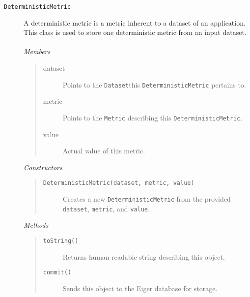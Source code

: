 \begin{description}
\item[\texttt{DeterministicMetric}] A deterministic metric is a metric inherent to a dataset of an application.
  This class is used to store one deterministic metric from an input dataset.\\ \\
  {\em Members}
	\begin{quote}
	\begin{description}
    \item[dataset] Points to the \texttt{Dataset}this \texttt{DeterministicMetric} pertains to.
    \item[metric] Points to the \texttt{Metric} describing this \texttt{DeterministicMetric}.
    \item[value] Actual value of this metric.
	\end{description}
	\end{quote}
  {\em Constructors}
	\begin{quote}
	\begin{description}
    \item[\texttt{DeterministicMetric(dataset, metric, value)}] Creates a new \texttt{DeterministicMetric} from the provided \texttt{dataset}, \texttt{metric}, and \texttt{value}.
	\end{description}
	\end{quote}
  {\em Methods}
	\begin{quote}
	\begin{description}
		\item[\texttt{toString()}] Returns human readable string describing this object.
	\item[\texttt{commit()}] Sends this object to the Eiger database for storage.
	\end{description}
	\end{quote}


\end{description}
